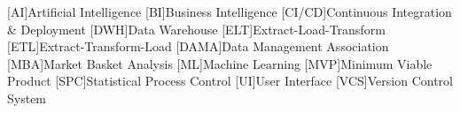 
\begin{acronym}[MMMMMM]
	[AI]{Artificial Intelligence}
	[BI]{Business Intelligence}
	[CI/CD]{Continuous Integration \& Deployment}
	[DWH]{Data Warehouse}
	[ELT]{Extract-Load-Transform}
	[ETL]{Extract-Transform-Load}
	[DAMA]{Data Management Association}
	[MBA]{Market Basket Analysis}
	[ML]{Machine Learning}
	[MVP]{Minimum Viable Product}
	[SPC]{Statistical Process Control}
	[UI]{User Interface}
	[VCS]{Version Control System}
\end{acronym}
